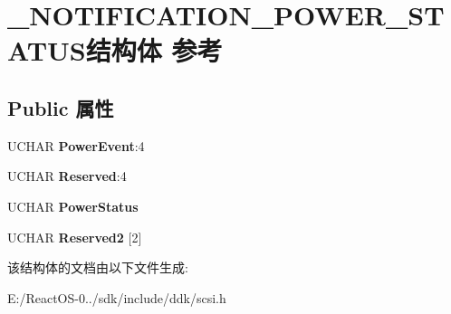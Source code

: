 \hypertarget{struct___n_o_t_i_f_i_c_a_t_i_o_n___p_o_w_e_r___s_t_a_t_u_s}{}\section{\+\_\+\+N\+O\+T\+I\+F\+I\+C\+A\+T\+I\+O\+N\+\_\+\+P\+O\+W\+E\+R\+\_\+\+S\+T\+A\+T\+U\+S结构体 参考}
\label{struct___n_o_t_i_f_i_c_a_t_i_o_n___p_o_w_e_r___s_t_a_t_u_s}
\subsection*{Public 属性}
\begin{DoxyCompactItemize}
\item 
\mbox{\label{struct___n_o_t_i_f_i_c_a_t_i_o_n___p_o_w_e_r___s_t_a_t_u_s_a9ab338f85a10e8c3d77f49c5396f0fa1}} 
U\+C\+H\+AR {\bfseries Power\+Event}\+:4
\item 
\mbox{\label{struct___n_o_t_i_f_i_c_a_t_i_o_n___p_o_w_e_r___s_t_a_t_u_s_ae9f697b3be5974991c585f5f4534b691}} 
U\+C\+H\+AR {\bfseries Reserved}\+:4
\item 
\mbox{\label{struct___n_o_t_i_f_i_c_a_t_i_o_n___p_o_w_e_r___s_t_a_t_u_s_a274a53e348e35425b8a03307cb827468}} 
U\+C\+H\+AR {\bfseries Power\+Status}
\item 
\mbox{\label{struct___n_o_t_i_f_i_c_a_t_i_o_n___p_o_w_e_r___s_t_a_t_u_s_a2757a2d86d37dfa480858c2bead36fa8}} 
U\+C\+H\+AR {\bfseries Reserved2} \mbox{[}2\mbox{]}
\end{DoxyCompactItemize}


该结构体的文档由以下文件生成\+:\begin{DoxyCompactItemize}
\item 
E\+:/\+React\+O\+S-\/0../sdk/include/ddk/scsi.\+h\end{DoxyCompactItemize}
